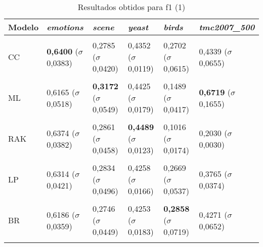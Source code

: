 
\begin{table}[htbp]
	\centering
	\caption{Resultados obtidos para f1 (1)}
		\begin{tabular}
        { p{0.88in} p{0.88in} p{0.88in} p{0.88in} p{0.88in} p{0.88in} }
        
        \hline
Modelo & \textit{emotions} & \textit{scene} & \textit{yeast} & \textit{birds} & \textit{tmc2007\_500} \\ 
\hline \\

CC & \textbf{0,6400} \newline ($\sigma$ 0,0383) & 0,2785 \newline ($\sigma$ 0,0420) & 0,4352 \newline ($\sigma$ 0,0119) & 0,2702 \newline ($\sigma$ 0,0615) & 0,4339 \newline ($\sigma$ 0,0655) \\ \\
ML & 0,6165 \newline ($\sigma$ 0,0518) & \textbf{0,3172} \newline ($\sigma$ 0,0549) & 0,4425 \newline ($\sigma$ 0,0179) & 0,1489 \newline ($\sigma$ 0,0417) & \textbf{0,6719} \newline ($\sigma$ 0,1655) \\ \\
RAK & 0,6374 \newline ($\sigma$ 0,0382) & 0,2861 \newline ($\sigma$ 0,0458) & \textbf{0,4489} \newline ($\sigma$ 0,0123) & 0,1016 \newline ($\sigma$ 0,0174) & 0,2030 \newline ($\sigma$ 0,0030) \\ \\
LP & 0,6314 \newline ($\sigma$ 0,0421) & 0,2834 \newline ($\sigma$ 0,0496) & 0,4258 \newline ($\sigma$ 0,0166) & 0,2669 \newline ($\sigma$ 0,0537) & 0,3765 \newline ($\sigma$ 0,0374) \\ \\
BR & 0,6186 \newline ($\sigma$ 0,0359) & 0,2746 \newline ($\sigma$ 0,0449) & 0,4253 \newline ($\sigma$ 0,0183) & \textbf{0,2858} \newline ($\sigma$ 0,0719) & 0,4271 \newline ($\sigma$ 0,0652) \\ \\

\end{tabular}
\end{table}

